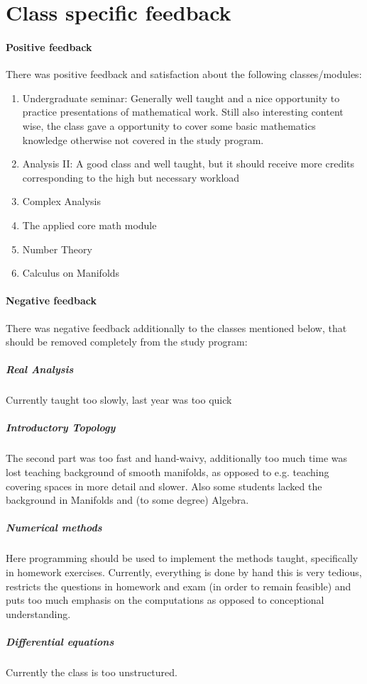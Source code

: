 

\section{Class specific feedback}
\label{sec-1}
\label{subsec:spec}
\paragraph{Positive feedback} There was positive feedback and satisfaction about the following classes/modules:
\begin{enumerate}
\item Undergraduate seminar: Generally well taught and a nice opportunity to practice presentations of mathematical work. Still also interesting content wise, the class gave a opportunity to cover some basic mathematics knowledge otherwise not covered in the study program.
\item Analysis II: A good class and well taught, but it should receive more credits corresponding to the high but necessary workload
\item Complex Analysis
\item The applied core math module
\item Number Theory
\item Calculus on Manifolds
\end{enumerate}

\paragraph{Negative feedback} There was negative feedback additionally to the classes mentioned below, that should be removed completely from the study program:
\subparagraph{Real Analysis} Currently taught too slowly, last year was too quick
\subparagraph{Introductory Topology} The second part was too fast and hand-waivy, additionally too much time was lost teaching background of smooth manifolds, as opposed to e.g. teaching covering spaces in more detail and slower. 
Also some students lacked the background in Manifolds and (to some degree) Algebra.
\subparagraph{Numerical methods} Here programming should be used to implement the methods taught, specifically in homework exercises. 
Currently, everything is done by hand this is very tedious, restricts the questions in homework and exam (in order to remain feasible) and puts too much emphasis on
the computations as opposed to conceptional understanding. 
\subparagraph{Differential equations} Currently the class is too unstructured.


